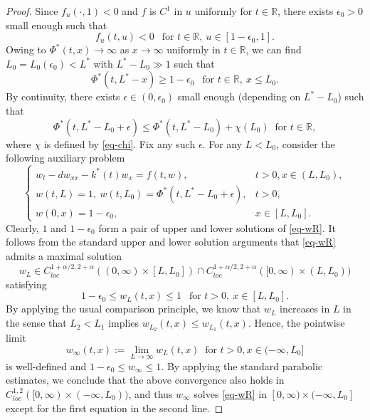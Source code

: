 \documentclass[11pt]{amsart}
\numberwithin{equation}{section}
\begin{document}
\begin{proof}
Since $f_u(\cdot,1)<0$ and $f$ is $C^1$ in $u$ uniformly for $t\in\mathbb R$,  there exists $\epsilon_0>0$ small enough such that  
\begin{equation}\label{eq-f_u}
  f_u(t,u)<0 ~~\text{ for }t\in\mathbb{R},\ u\in[1-\epsilon_0,1].
\end{equation} 
Owing to $\Phi^*(t,x) \to\infty$ as $x\to\infty$ uniformly in $t\in\mathbb R$,   we can find $L_0=L_0(\epsilon_0)<L^*$ with $L^*-L_0\gg 1$  such that 
\begin{equation}\label{eq-pl1}
  \Phi^*(t,L^*-x)\geq 1-\epsilon_0 ~~\text{ for }t\in\mathbb{R},\ x\leq L_0.
\end{equation}
By continuity,  there exists  $\epsilon\in(0,\epsilon_0)$ small enough (depending on $L^*-L_0$) such that
\begin{equation}\label{eq-pchi}
  \Phi^*(t,L^*-L_0+\epsilon)\leq \Phi^*(t,L^*-L_0)+\chi(L_0)~ \text{ for }t\in\mathbb R,
\end{equation}
where $\chi$ is defined by \eqref{eq-chi}.
Fix any such  $\epsilon$. For any $L<L_0$, consider the following auxiliary problem 
\begin{equation}\label{eq-wR}
  \begin{cases}
    w_t-dw_{xx}-k^*(t)w_x=f(t,w), &t>0, x\in(L,L_0),\\
    w(t,L)=1, ~w(t,L_0)=\Phi^*(t,L^*-L_0+\epsilon), &t>0,\\
    w(0,x)=1-\epsilon_0, &x\in[L,L_0].
  \end{cases}
\end{equation}
Clearly, $1$ and $1-\epsilon_0$ form a pair of upper and lower solutions of \eqref{eq-wR}.  It follows from the standard upper and lower solution arguments that \eqref{eq-wR} admits a maximal solution 
$$w_L\in C_{loc}^{1+\alpha/2,2+\alpha}((0,\infty)\times[L,L_0])\cap C_{loc}^{1+\alpha/2,2+\alpha}([0,\infty)\times(L,L_0))$$
 satisfying
\begin{equation}\label{eq-1pw}
 1-\epsilon_0\leq  w_L(t,x)\leq 1 ~~\text{ for }t>0,\ x\in[L,L_0].
\end{equation}
By applying the usual comparison principle, we know that $w_L$ increases in $L$ in the sense that $L_2<L_1$ implies $w_{L_2}(t,x)\leq w_{L_1}(t,x)$. Hence, the pointwise limit
\begin{equation*}
   w_\infty(t,x):=\lim_{L\to\infty}w_L(t,x) \ \mbox{ for } t>0,x\in(-\infty,L_0]
 \end{equation*}
 is well-defined and  $1-\epsilon_0\leq w_\infty\leq 1$. By applying  the standard parabolic estimates, we conclude that the above convergence also holds in $C_{loc}^{1,2}([0,\infty)\times(-\infty,L_0))$,  and thus $w_\infty$ solves \eqref{eq-wR} in $[0,\infty) \times(-\infty,L_0]$  except for the first equation in the second line.

\end{proof}
\end{document}

